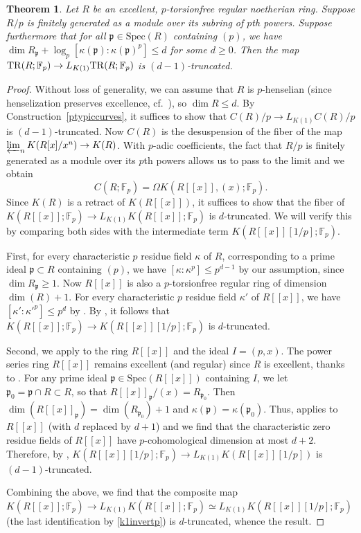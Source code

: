 \documentclass{amsart}
\newtheorem{theorem}{Theorem}[section]
\theoremstyle{definition}
\newcommand{\spec}{\mathrm{Spec}}
\begin{document}
\begin{theorem} 
\label{asymptoticK1TR}
Let $R$ be an excellent,  $p$-torsionfree regular noetherian ring.   Suppose 
$R/p$ is finitely generated as a module over its subring of $p$th powers. 
Suppose furthermore that
for all $\mathfrak{p} \in \spec(R)$ containing $(p)$, we have
$\dim R_{\mathfrak{p}} + \log_p [ \kappa(\mathfrak{p}):\kappa(\mathfrak{p})^p]
\leq d$ for some $d \geq 0$. 
Then the map $\mathrm{TR}(R; \mathbb{F}_p) \to L_{K(1)} \mathrm{TR}(R; \mathbb{F}_p)$ is 
$ (d-1)$-truncated. 
\end{theorem} 
\begin{proof} 
Without loss of generality, we can assume that $R$ is $p$-henselian (since
henselization preserves excellence, cf.~\cite{Gre76}), so $\dim R \leq d$. 
By 
Construction~\ref{ptypiccurves}, it suffices to show that 
$C(R)/p \to L_{K(1)} C(R)/p$ is 
$(d-1)$-truncated. Now $C(R)$ is the desuspension of the fiber of the map 
$\varprojlim_n K( R[x]/x^n) \to K(R)$. 
With $p$-adic coefficients, the fact that $R/p$ is finitely generated as a
module over its
$p$th powers allows us to pass to the
limit \cite[Th.~F]{CMM} and we obtain
\[ C(R; \mathbb{F}_p) = \Omega  K(R[[x]], (x); \mathbb{F}_p).  \]
Since $K(R)$ is a retract of $K(R[[x]])$, it suffices to show that the fiber of 
$K(R[[x]]; \mathbb{F}_p) \to L_{K(1)}K(R[[x]]; \mathbb{F}_p) $ 
is $d$-truncated. 
We will verify this by comparing both sides with the intermediate term $K( R[[x]][1/p];
\mathbb{F}_p)$. 


First, 
for every characteristic $p$ residue field $\kappa$ of $R$, corresponding to a prime
ideal $\mathfrak{p} \subset R$ containing $(p)$,  we have 
$[\kappa: \kappa^p] \leq p^{d-1}$ by our assumption, since $\dim
R_{\mathfrak{p}} \geq 1$. 
Now
$R[[x]]$ is also a $p$-torsionfree regular ring of dimension $\dim(R) + 1$.
For every characteristic $p$ residue field $\kappa'$ of $R[[x]]$, we have 
$[\kappa': \kappa'^p] \leq p^{d}$ by . 
By 
, it follows that
$K(R[[x]]; \mathbb{F}_p) \to K(R[[x]][1/p]; \mathbb{F}_p)$ is 
$d$-truncated. 


Second, we apply 
 to the ring $R[[x]]$ and the ideal $I = (p, x)$. 
The power series ring $R[[x]]$ remains excellent (and regular) since $R$ is excellent, thanks to 
\cite{KS19}. 
For any prime ideal $\mathfrak{p} \in \spec( R[[x]])$ containing $I$,  we 
let $\mathfrak{p}_0 = \mathfrak{p} \cap R \subset R$, so that
$R[[x]]_{\mathfrak{p}}/(x) = R_{\mathfrak{p}_0}$. 
Then 
$\dim( R[[x]]_{\mathfrak{p}}) 
 = \dim( R_{\mathfrak{p}_0})+ 1$ and 
 $\kappa( \mathfrak{p}) = \kappa(\mathfrak{p}_0)$. 
 Thus, 
 applies to $R[[x]]$ (with $d$ replaced by $d+1$) and 
we find that the characteristic zero residue fields of $R[[x]]$ have
$p$-cohomological dimension at most $d + 2$. 
Therefore, 
by
, 
$ K( R[[x]][1/p]; \mathbb{F}_p) \to L_{K(1)} K( R[[x]][1/p])$ is $
(d-1)$-truncated. 


Combining the above, we find that the composite map 
$K(R[[x]]; \mathbb{F}_p) \to L_{K(1)} K(R[[x]]; \mathbb{F}_p) \simeq L_{K(1)}
 K( R[[x]][1/p];
\mathbb{F}_p)$ (the last identification by 
\eqref{k1invertp})
is $d$-truncated, whence the result. 
\end{proof} 
\end{document}
